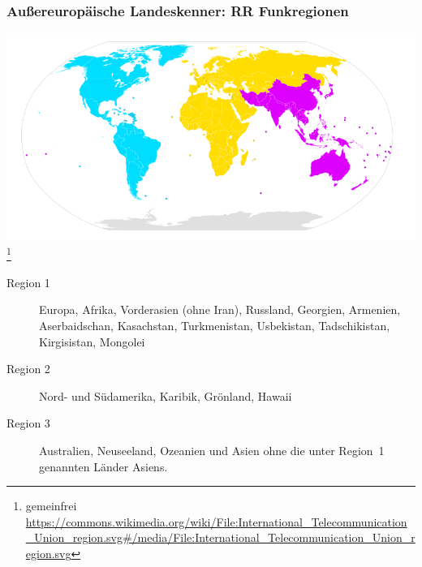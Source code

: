 \begin{frame}
    \frametitle{Außereuropäische Landeskenner: RR Funkregionen}

    \begin{center}
      \includegraphics[width=.7\textheight]{bv06/800px-International_Telecommunication_Union_region.png}
      \footnote{\scriptsize gemeinfrei \url{https://commons.wikimedia.org/wiki/File:International_Telecommunication_Union_region.svg\#/media/File:International_Telecommunication_Union_region.svg}}
    \end{center}

    \small{
    \begin{description}
        \item[Region 1] Europa, Afrika, Vorderasien (ohne Iran), Russland, Georgien,
                        Armenien, Aserbaidschan, Kasachstan, Turkmenistan,
                        Usbekistan, Tadschikistan, Kirgisistan, Mongolei
        \item[Region 2] Nord- und Südamerika, Karibik, Grönland, Hawaii
        \item[Region 3] Australien, Neuseeland, Ozeanien und Asien ohne die unter
                        Region~1 genannten Länder Asiens.
    \end{description}
    }

\end{frame}

